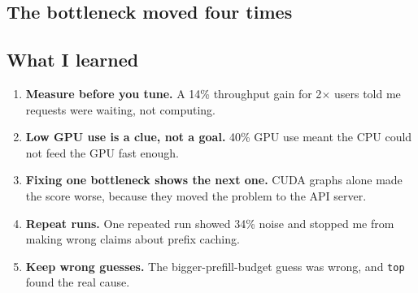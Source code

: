 \documentclass[10pt,a4paper]{article}
\begin{document}
\subsection{The bottleneck moved four times}
\begin{center}
\end{center}

\subsection{What I learned}
\begin{enumerate}
  \item \textbf{Measure before you tune.} A 14\% throughput gain for 2$\times$ users told me requests were waiting, not computing.
  \item \textbf{Low GPU use is a clue, not a goal.} 40\% GPU use meant the CPU could not feed the GPU fast enough.
  \item \textbf{Fixing one bottleneck shows the next one.} CUDA graphs alone made the score worse, because they moved the problem to the API server.
  \item \textbf{Repeat runs.} One repeated run showed 34\% noise and stopped me from making wrong claims about prefix caching.
  \item \textbf{Keep wrong guesses.} The bigger-prefill-budget guess was wrong, and \texttt{top} found the real cause.
\end{enumerate}
\end{document}
